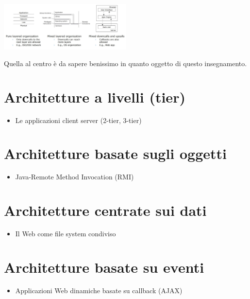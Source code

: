 \begin{center}
    \includegraphics[width=0.5\textwidth]{img/architetturaStrati2.jpg}
\end{center}
Quella al centro è da sapere benissimo in quanto oggetto di questo insegnamento.


\section{Architetture a livelli (tier)}
\begin{itemize}
    \item Le applicazioni client server (2-tier, 3-tier)
\end{itemize}

\section{Architetture basate sugli oggetti}
\begin{itemize}
    \item Java-Remote Method Invocation (RMI)
\end{itemize}

\section{Architetture centrate sui dati}
\begin{itemize}
    \item Il Web come file system condiviso
\end{itemize}

\section{Architetture basate su eventi}
\begin{itemize}
    \item Applicazioni Web dinamiche basate su callback (AJAX)
\end{itemize}


